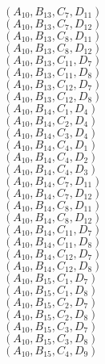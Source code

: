 \documentclass[14pt]{article}
\begin{document}
    $({A}_{10}, {B}_{13}, {C}_{7}, {D}_{11}) $ \\ 
    $({A}_{10}, {B}_{13}, {C}_{7}, {D}_{12}) $ \\ 
    $({A}_{10}, {B}_{13}, {C}_{8}, {D}_{11}) $ \\ 
    $({A}_{10}, {B}_{13}, {C}_{8}, {D}_{12}) $ \\ 
    $({A}_{10}, {B}_{13}, {C}_{11}, {D}_{7}) $ \\ 
    $({A}_{10}, {B}_{13}, {C}_{11}, {D}_{8}) $ \\ 
    $({A}_{10}, {B}_{13}, {C}_{12}, {D}_{7}) $ \\ 
    $({A}_{10}, {B}_{13}, {C}_{12}, {D}_{8}) $ \\ 
    $({A}_{10}, {B}_{14}, {C}_{1}, {D}_{4}) $ \\ 
    $({A}_{10}, {B}_{14}, {C}_{2}, {D}_{4}) $ \\ 
    $({A}_{10}, {B}_{14}, {C}_{3}, {D}_{4}) $ \\ 
    $({A}_{10}, {B}_{14}, {C}_{4}, {D}_{1}) $ \\ 
    $({A}_{10}, {B}_{14}, {C}_{4}, {D}_{2}) $ \\ 
    $({A}_{10}, {B}_{14}, {C}_{4}, {D}_{3}) $ \\ 
    $({A}_{10}, {B}_{14}, {C}_{7}, {D}_{11}) $ \\ 
    $({A}_{10}, {B}_{14}, {C}_{7}, {D}_{12}) $ \\ 
    $({A}_{10}, {B}_{14}, {C}_{8}, {D}_{11}) $ \\ 
    $({A}_{10}, {B}_{14}, {C}_{8}, {D}_{12}) $ \\ 
    $({A}_{10}, {B}_{14}, {C}_{11}, {D}_{7}) $ \\ 
    $({A}_{10}, {B}_{14}, {C}_{11}, {D}_{8}) $ \\ 
    $({A}_{10}, {B}_{14}, {C}_{12}, {D}_{7}) $ \\ 
    $({A}_{10}, {B}_{14}, {C}_{12}, {D}_{8}) $ \\ 
    $({A}_{10}, {B}_{15}, {C}_{1}, {D}_{7}) $ \\ 
    $({A}_{10}, {B}_{15}, {C}_{1}, {D}_{8}) $ \\ 
    $({A}_{10}, {B}_{15}, {C}_{2}, {D}_{7}) $ \\ 
    $({A}_{10}, {B}_{15}, {C}_{2}, {D}_{8}) $ \\ 
    $({A}_{10}, {B}_{15}, {C}_{3}, {D}_{7}) $ \\ 
    $({A}_{10}, {B}_{15}, {C}_{3}, {D}_{8}) $ \\ 
    $({A}_{10}, {B}_{15}, {C}_{4}, {D}_{9}) $ \\ 
\end{document}

